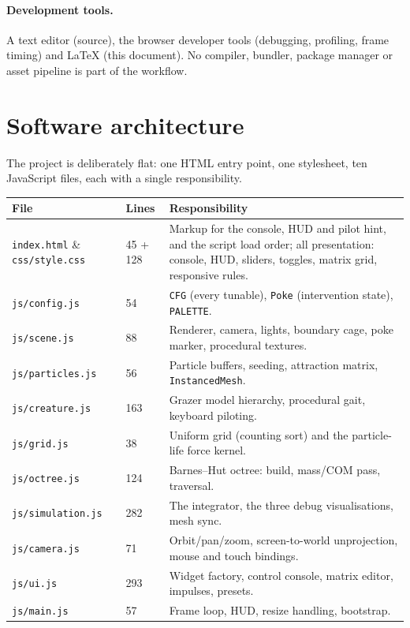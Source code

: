 \documentclass[10pt,a4paper]{article}
\newcommand{\code}[1]{\texttt{\small #1}}
\newcommand{\file}[1]{\texttt{\small\color{accent!70!black}#1}}
\begin{document}
\paragraph{Development tools.} A text editor (source), the browser developer tools (debugging, profiling,
frame timing) and \LaTeX{} (this document). No compiler, bundler, package manager or asset pipeline is
part of the workflow.

\section{Software architecture}
\label{sec:architecture}

The project is deliberately flat: one HTML entry point, one stylesheet, ten JavaScript files, each with a
single responsibility.

\begin{center}
\small
\begin{tabular}{@{}p{3.4cm}p{1.0cm}p{11.6cm}@{}}
\toprule
\textbf{File} & \textbf{Lines} & \textbf{Responsibility}\\
\midrule
\file{index.html} \& \file{css/style.css} & 45 + 128 & Markup for the console, HUD and pilot hint, and the script load order; all presentation: console, HUD, sliders, toggles, matrix grid, responsive rules.\\
\file{js/config.js}      & 54  & \code{CFG} (every tunable), \code{Poke} (intervention state), \code{PALETTE}.\\
\file{js/scene.js}       & 88  & Renderer, camera, lights, boundary cage, poke marker, procedural textures.\\
\file{js/particles.js}   & 56  & Particle buffers, seeding, attraction matrix, \code{InstancedMesh}.\\
\file{js/creature.js}    & 163 & Grazer model hierarchy, procedural gait, keyboard piloting.\\
\file{js/grid.js}        & 38  & Uniform grid (counting sort) and the particle-life force kernel.\\
\file{js/octree.js}      & 124 & Barnes--Hut octree: build, mass/COM pass, traversal.\\
\file{js/simulation.js}  & 282 & The integrator, the three debug visualisations, mesh sync.\\
\file{js/camera.js}      & 71  & Orbit/pan/zoom, screen-to-world unprojection, mouse and touch bindings.\\
\file{js/ui.js}          & 293 & Widget factory, control console, matrix editor, impulses, presets.\\
\file{js/main.js}        & 57  & Frame loop, HUD, resize handling, bootstrap.\\
\bottomrule
\end{tabular}
\end{center}
\end{document}
